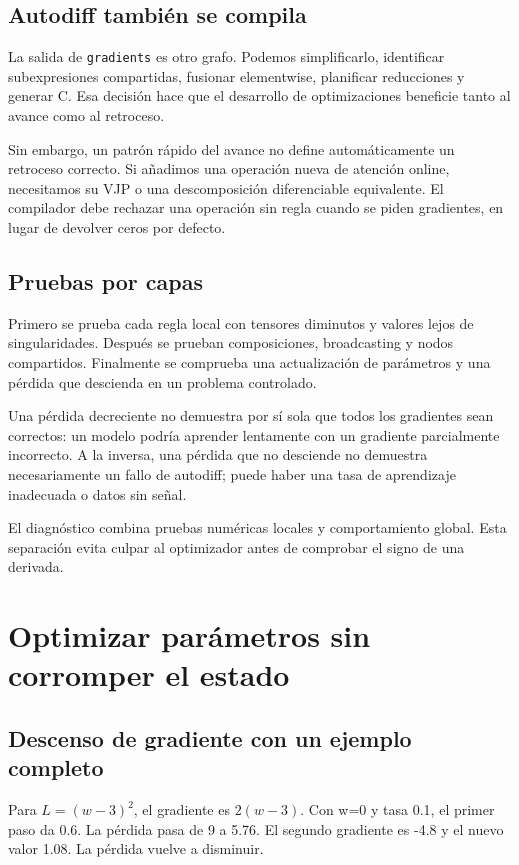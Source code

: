 \documentclass[12pt,a4paper,oneside]{report}
\begin{document}
\section{Autodiff también se compila}
La salida de \texttt{gradients} es otro grafo. Podemos simplificarlo, identificar subexpresiones compartidas, fusionar elementwise, planificar reducciones y generar C. Esa decisión hace que el desarrollo de optimizaciones beneficie tanto al avance como al retroceso.

Sin embargo, un patrón rápido del avance no define automáticamente un retroceso correcto. Si añadimos una operación nueva de atención online, necesitamos su VJP o una descomposición diferenciable equivalente. El compilador debe rechazar una operación sin regla cuando se piden gradientes, en lugar de devolver ceros por defecto.

\section{Pruebas por capas}
Primero se prueba cada regla local con tensores diminutos y valores lejos de singularidades. Después se prueban composiciones, broadcasting y nodos compartidos. Finalmente se comprueba una actualización de parámetros y una pérdida que descienda en un problema controlado.

Una pérdida decreciente no demuestra por sí sola que todos los gradientes sean correctos: un modelo podría aprender lentamente con un gradiente parcialmente incorrecto. A la inversa, una pérdida que no desciende no demuestra necesariamente un fallo de autodiff; puede haber una tasa de aprendizaje inadecuada o datos sin señal.

El diagnóstico combina pruebas numéricas locales y comportamiento global. Esta separación evita culpar al optimizador antes de comprobar el signo de una derivada.

\chapter{Optimizar parámetros sin corromper el estado}
\label{ch:optimizadores}
\section{Descenso de gradiente con un ejemplo completo}
Para $L=(w-3)^2$, el gradiente es $2(w-3)$. Con w=0 y tasa 0.1, el primer paso da 0.6. La pérdida pasa de 9 a 5.76. El segundo gradiente es -4.8 y el nuevo valor 1.08. La pérdida vuelve a disminuir.
\end{document}
